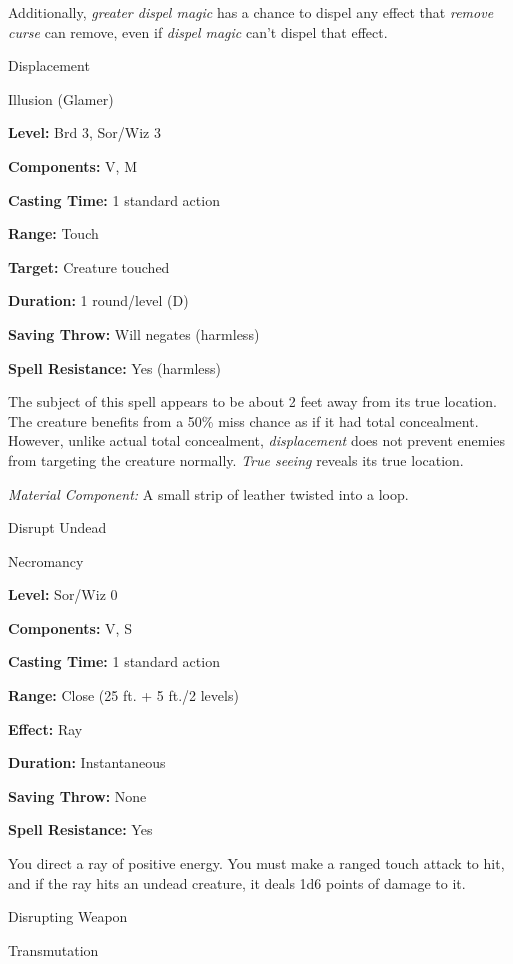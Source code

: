 \documentclass{article}
\begin{document}
Additionally, \textit{greater dispel magic }has a chance to dispel any effect that 
\textit{remove curse }can remove, even if \textit{dispel magic }can't dispel that 
effect.

\vspace{12pt}
Displacement

Illusion (Glamer)

\textbf{Level:} Brd 3, Sor/Wiz 3

\textbf{Components:} V, M

\textbf{Casting Time:} 1 standard action

\textbf{Range:} Touch

\textbf{Target:} Creature touched

\textbf{Duration:} 1 round/level (D)

\textbf{Saving Throw: }Will negates (harmless)

\textbf{Spell Resistance:} Yes (harmless)

The subject of this spell appears to be about 2 feet away from its true location. 
The creature benefits from a 50\% miss chance as if it had total concealment. However, 
unlike actual total concealment, \textit{displacement }does not prevent enemies 
from targeting the creature normally. \textit{True seeing }reveals its true location.

\textit{Material Component: }A small strip of leather twisted into a loop.

\vspace{12pt}
Disrupt Undead

Necromancy

\textbf{Level:} Sor/Wiz 0

\textbf{Components:} V, S

\textbf{Casting Time:} 1 standard action

\textbf{Range:} Close (25 ft. + 5 ft./2 levels)

\textbf{Effect:} Ray

\textbf{Duration:} Instantaneous

\textbf{Saving Throw:} None

\textbf{Spell Resistance:} Yes

You direct a ray of positive energy. You must make a ranged touch attack to hit, 
and if the ray hits an undead creature, it deals 1d6 points of damage to it.

\vspace{12pt}
Disrupting Weapon

Transmutation
\end{document}
